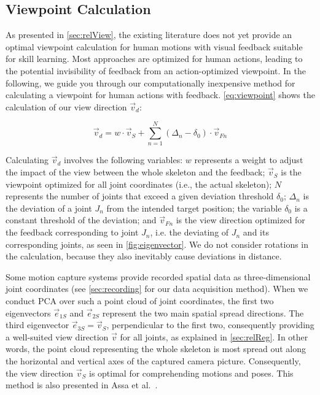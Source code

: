 \subsection*{Viewpoint Calculation \label{sec:methViewCalc}}

As presented in \autoref{sec:relView}, the existing literature does not yet provide an optimal viewpoint calculation for human motions with visual feedback suitable for skill learning. Most approaches are optimized for human actions, leading to the potential invisibility of feedback from an action-optimized viewpoint. In the following, we guide you through our computationally inexpensive method for calculating a viewpoint for human actions with feedback. \autoref{eq:viewpoint} shows the calculation of our view direction $\vec{v}_d$:

\begin{equation}
	\label{eq:viewpoint}
	\vec{v}_d = w \cdot \vec{v}_{S} + \sum_{n=1}^N (\Delta_n - \delta_0) \cdot \vec{v}_{Fn}
\end{equation}

Calculating $\vec{v}_d$ involves the following variables: \(w\) represents a weight to adjust the impact of the view between the whole skeleton and the feedback; \(\vec{v}_S\) is the viewpoint optimized for all joint coordinates (i.e., the actual skeleton); \(N\) represents the number of joints that exceed a given deviation threshold \(\delta_0\); \(\Delta_n\) is the deviation of a joint \(J_n\) from the intended target position; the variable \(\delta_0\) is a constant threshold of the deviation; and \(\vec{v}_{Fn}\) is the view direction optimized for the feedback corresponding to joint \(J_n\), i.e. the deviating of \(J_n\) and its corresponding joints, as seen in \autoref{fig:eigenvector}. We do not consider rotations in the calculation, because they also inevitably cause deviations in distance.

Some motion capture systems provide recorded spatial data as three-dimensional joint coordinates (see \autoref{sec:recording} for our data acquisition method). When we conduct PCA over such a point cloud of joint coordinates, the first two eigenvectors \(\vec{e}_{1S}\) and \(\vec{e}_{2S}\) represent the two main spatial spread directions. The third eigenvector \(\vec{e}_{3S} = \vec{v}_S\), perpendicular to the first two, consequently providing a well-suited view direction $\vec{v}$ for all joints, as explained in \autoref{sec:relReg}. In other words, the point cloud representing the whole skeleton is most spread out along the horizontal and vertical axes of the captured camera picture. Consequently, the view direction \(\vec{v}_S\) is optimal for comprehending motions and poses. This method is also presented in Assa et al.~\cite{assa2008moh}.

